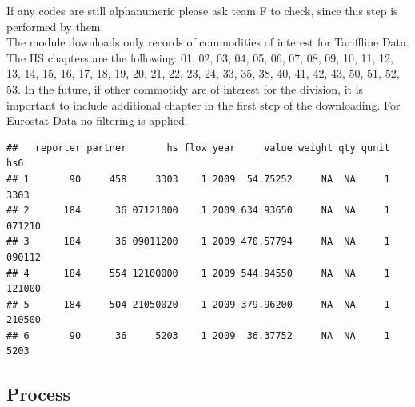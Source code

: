 \documentclass[nojss]{jss}\usepackage[]{graphicx}\usepackage[]{color}
\makeatletter
\newenvironment{kframe}{%
 \def\at@end@of@kframe{}%
 \ifinner\ifhmode%
  \def\at@end@of@kframe{\end{minipage}}%
  \begin{minipage}{\columnwidth}%
 \fi\fi%
 \def\FrameCommand##1{\hskip\@totalleftmargin \hskip-\fboxsep
 \colorbox{shadecolor}{##1}\hskip-\fboxsep
     \hskip-\linewidth \hskip-\@totalleftmargin \hskip\columnwidth}%
 \MakeFramed {\advance\hsize-\width
   \@totalleftmargin\z@ \linewidth\hsize
   \@setminipage}}%
 {\par\unskip\endMakeFramed%
 \at@end@of@kframe}
\newenvironment{knitrout}{}{} %
\makeatother
\begin{document}
If any codes are still alphanumeric please ask team F to check, since this step is performed by them.\\
The module downloads only records of commodities of interest for Tariffline Data. The HS chapters are the following: 01, 02, 03, 04, 05, 06, 07, 08, 09, 10, 11, 12, 13, 14, 15, 16, 17, 18, 19, 20, 21, 22, 23, 24, 33, 35, 38, 40, 41, 42, 43, 50, 51, 52, 53. In the future, if other commotidy are of interest for the division, it is important to include additional chapter in the first step of the downloading. For Eurostat Data no filtering is applied.

\begin{knitrout}
\color{fgcolor}\begin{kframe}
\begin{verbatim}
##   reporter partner       hs flow year     value weight qty qunit    hs6
## 1       90     458     3303    1 2009  54.75252     NA  NA     1   3303
## 2      184      36 07121000    1 2009 634.93650     NA  NA     1 071210
## 3      184      36 09011200    1 2009 470.57794     NA  NA     1 090112
## 4      184     554 12100000    1 2009 544.94550     NA  NA     1 121000
## 5      184     504 21050020    1 2009 379.96200     NA  NA     1 210500
## 6       90      36     5203    1 2009  36.37752     NA  NA     1   5203
\end{verbatim}
\end{kframe}
\end{knitrout}



\subsection{Process}
\end{document}
